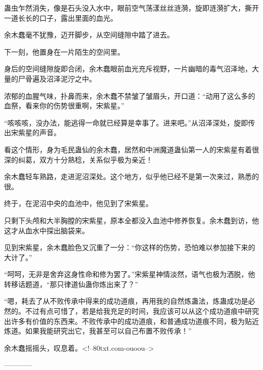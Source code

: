 \begin{this_body}
蛊虫乍然消失，像是石头没入水中，眼前空气荡漾丝丝涟漪，旋即涟漪扩大，撕开一道长长的口子，露出里面的血光。

余木蠢毫不犹豫，迈开脚步，从空间缝隙中踏了进去。

下一刻，他置身在一片陌生的空间里。

身后的空间缝隙旋即合闭，余木蠢眼前血光充斥视野，一片幽暗的毒气沼泽地，大量的尸骨遍及沼泽泥泞之中。

浓郁的血腥气味，扑鼻而来，余木蠢不禁皱了皱眉头，开口道：“动用了这么多的血祭，看来你的伤势很重啊，宋紫星。”

“咳咳咳，没办法，能逃得一命就已经算是幸事了。进来吧。”从沼泽深处，旋即传出宋紫星的声音。

看这个情形，身为毛民蛊仙的余木蠢，居然和中洲魔道蛊仙第一人的宋紫星有着很深的纠葛，双方十分熟稔，关系似乎极为亲近！

余木蠢轻车熟路，走进泥沼深处。这个地方，似乎他已经不是第一次来过，熟悉的很。

终于，在泥沼中央的血池中，他见到了宋紫星。

只剩下头颅和大半胸膛的宋紫星，原本全都没入血池中修养恢复。余木蠢到访，他这才从血水中探出脑袋来。

见到宋紫星，余木蠢脸色又沉重了一分：“你这样的伤势，恐怕难以参加接下来的大计了。”

“呵呵，无非是舍弃这身性命和修为罢了。”宋紫星神情淡然，语气也极为洒脱，他转移话题道，“那只律道仙蛊你炼出来了？”

“嗯，耗去了从不败传承中得来的成功道痕，再用我的自然炼蛊法，炼蛊成功是必然的。不过有点可惜了，若是给我充足的时间，我应该可以从这个成功道痕中研究出许多有价值的东西来。不败传承中的成功道痕，和普通成功道痕不同，极为贴近炼道。如果我能研究出它，我甚至可以自己布置不败传承！”

余木蠢摇摇头，叹息着。<!--80txt.com-ouoou-->

------------

\end{this_body}

